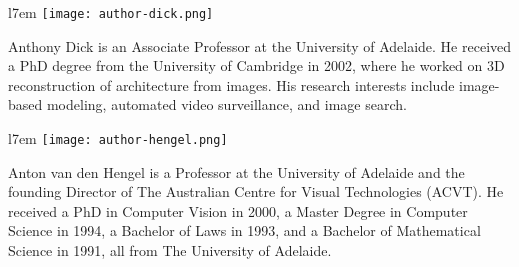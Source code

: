 \documentclass[10pt,journal,compsoc]{IEEEtran}
\begin{document}
\vspace{-0.5cm}
\begin{wrapfigure}{l}{7em}
\vspace{-10pt}
  \texttt{[image: author-dick.png]}
\end{wrapfigure}
\begin{IEEEbiographynophoto}{Anthony Dick}
is an Associate Professor at the University of Adelaide. He
received a PhD degree from the University of Cambridge in 2002, where he worked on 3D reconstruction of architecture from images. His research interests include image-based modeling, automated video surveillance, and image search.
\end{IEEEbiographynophoto}

\vspace{-0.5cm}
\begin{wrapfigure}{l}{7em}
\vspace{-10pt}
  \texttt{[image: author-hengel.png]}
\end{wrapfigure}
\begin{IEEEbiographynophoto}{Anton van den Hengel}
is a Professor at the University of Adelaide and the founding Director of The Australian Centre for Visual Technologies (ACVT). He received a PhD in Computer Vision in 2000, a Master Degree in Computer Science in 1994, a Bachelor of Laws in 1993, and a Bachelor of Mathematical Science in 1991, all from The University of Adelaide.
\end{IEEEbiographynophoto}
\end{document}
